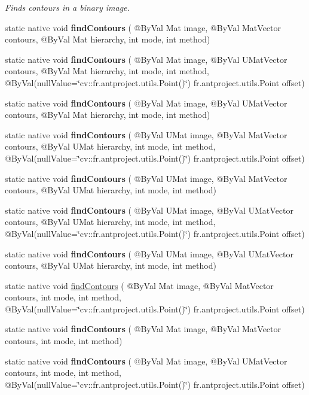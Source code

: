 \begin{DoxyCompactItemize}
\begin{DoxyCompactList}\small\item\em Finds contours in a binary image. \end{DoxyCompactList}\item 
static native void {\bfseries find\+Contours} ( @By\+Val Mat image, @By\+Val Mat\+Vector contours, @By\+Val Mat hierarchy, int mode, int method)
\item 
static native void {\bfseries find\+Contours} ( @By\+Val Mat image, @By\+Val U\+Mat\+Vector contours, @By\+Val Mat hierarchy, int mode, int method, @By\+Val(null\+Value=\char`\"{}cv\+::\+fr.antproject.utils.Point()\char`\"{}) fr.antproject.utils.Point offset)
\item 
static native void {\bfseries find\+Contours} ( @By\+Val Mat image, @By\+Val U\+Mat\+Vector contours, @By\+Val Mat hierarchy, int mode, int method)
\item 
static native void {\bfseries find\+Contours} ( @By\+Val U\+Mat image, @By\+Val Mat\+Vector contours, @By\+Val U\+Mat hierarchy, int mode, int method, @By\+Val(null\+Value=\char`\"{}cv\+::\+fr.antproject.utils.Point()\char`\"{}) fr.antproject.utils.Point offset)
\item 
static native void {\bfseries find\+Contours} ( @By\+Val U\+Mat image, @By\+Val Mat\+Vector contours, @By\+Val U\+Mat hierarchy, int mode, int method)
\item 
static native void {\bfseries find\+Contours} ( @By\+Val U\+Mat image, @By\+Val U\+Mat\+Vector contours, @By\+Val U\+Mat hierarchy, int mode, int method, @By\+Val(null\+Value=\char`\"{}cv\+::\+fr.antproject.utils.Point()\char`\"{}) fr.antproject.utils.Point offset)
\item 
static native void {\bfseries find\+Contours} ( @By\+Val U\+Mat image, @By\+Val U\+Mat\+Vector contours, @By\+Val U\+Mat hierarchy, int mode, int method)
\item 
static native void \hyperlink{group__imgproc__shape_ga9242b107e02badf32d704830cda84585}{find\+Contours} ( @By\+Val Mat image, @By\+Val Mat\+Vector contours, int mode, int method, @By\+Val(null\+Value=\char`\"{}cv\+::\+fr.antproject.utils.Point()\char`\"{}) fr.antproject.utils.Point offset)
\item 
static native void {\bfseries find\+Contours} ( @By\+Val Mat image, @By\+Val Mat\+Vector contours, int mode, int method)
\item 
static native void {\bfseries find\+Contours} ( @By\+Val Mat image, @By\+Val U\+Mat\+Vector contours, int mode, int method, @By\+Val(null\+Value=\char`\"{}cv\+::\+fr.antproject.utils.Point()\char`\"{}) fr.antproject.utils.Point offset)

\end{DoxyCompactItemize}
